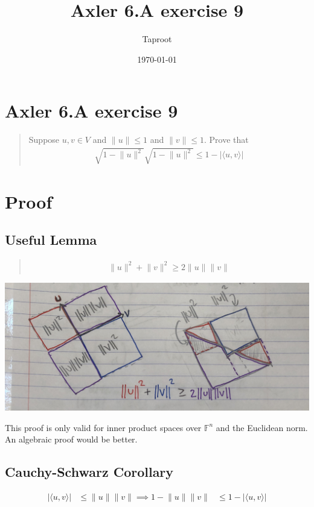 \documentclass[letterpaper]{article}
\author{Taproot}
\date{\today}
\title{Axler 6.A exercise 9}
\renewcommand\maketitle{}
\begin{document}
\maketitle
\section{Axler 6.A exercise 9}
\label{sec:org1d7a9f6}
\begin{quote}
Suppose \(u, v \in V\) and \(\lVert u \rVert \leq  1\) and \(\lVert v \rVert \leq  1\). Prove that
\[\begin{aligned}
  \sqrt{1-\lVert u\rVert^2}\sqrt{1-\lVert u \rVert ^2} \leq  1- | \langle u, v \rangle |
  \end{aligned}\]
\end{quote}
\section{Proof}
\label{sec:orgbc7cace}

\subsection{Useful Lemma}
\label{sec:org4fca3ff}
\begin{quote}
\[\begin{aligned}
   \lVert u \rVert ^2 + \lVert v \rVert ^2 \geq 2 \lVert u \rVert \lVert v \rVert
   \end{aligned}\]
\end{quote}

\begin{center}
\includegraphics[width=.9\linewidth]{KBe21math530srcAxler6A9Supplement.png}
\end{center}

This proof is only valid for inner product spaces over \(\mathbb{F}^n\) and the Euclidean norm. An algebraic proof would be better.

\subsection{Cauchy-Schwarz Corollary}
\label{sec:org5e35e79}
\[\begin{aligned}
  \lvert \langle u, v \rangle \rvert &\leq \lVert u \rVert \lVert v \rVert \implies 1- \lVert u \rVert \lVert v \rVert &\leq 1- \lvert \langle u, v \rangle \rvert
  \end{aligned}\]
\end{document}
